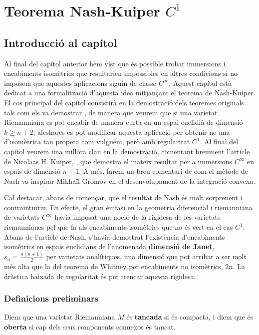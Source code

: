 \chapter{Teorema Nash-Kuiper $C^1$}\label{chap:capitol_nash}

\section{Introducció al capítol}
Al final del capítol anterior hem vist que és possible trobar immersions i encabiments isomètrics que resultarien impossibles en altres condicions si no imposem que aquestes aplicacions siguin de classe $C^\infty$. Aquest capítol està dedicat a una formalització d'aquesta idea mitjançant el teorema de Nash-Kuiper. El cos principal del capítol consistirà en la demostració dels teoremes originals tals com els va demostrar \cite{nash1954}, de manera que veurem que si una varietat Riemanniana es pot encabir de manera curta en un espai euclidià de dimensió $k\ge n+2$, aleshores es pot modificar aquesta aplicació per obtenir-ne una d'isomètrica tan propera com vulguem, però amb regularitat $C^1$. Al final del capítol veurem una millora clau en la demostració, comentant breument l'article de Nicolaas H. Kuiper, \cite{kuiper1955}, que demostra el mateix resultat per a immersions $C^\infty$ en espais de dimensió $n+1$. A més, farem un breu comentari de com el mètode de Nash va inspirar Mikhaïl Gromov en el desenvolupament de la integració convexa. 

Cal destacar, abans de començar, que el resultat de Nash és molt sorprenent i contraintuïtiu. En efecte, el gran èmfasi en la geometria diferencial i riemanniana de varietats $C^\infty$ havia imposat una noció de la rigidesa de les varietats riemannianes pel que fa als encabiments isomètrics que no és cert en el cas $C^1$. Abans de l'article de Nash, s'havia demostrat l'existència d'encabiments isomètrics en espais euclidians de l'anomenada \textbf{dimensió de Janet}, $s_n = \frac{n(n+1)}{2}$ per varietats analítiques, una dimensió que pot arribar a ser molt més alta que la del teorema de Whitney per encabiments no isomètrics, $2n$. La dràstica baixada de regularitat és  per trencar aquesta rigidesa.
\\

\subsection{Definicions preliminars}
\begin{defi}
    Diem que una varietat Riemanniana $M$ és \textbf{tancada} si és compacta, i diem que és \textbf{oberta} si cap dels seus components connexos és tancat.
\end{defi}


